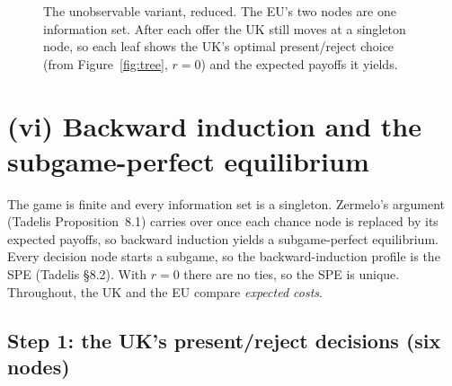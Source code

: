 \documentclass[11pt,a4paper]{article}
\newcommand{\Nt}{\mathit{Nt}}
\newcommand{\dF}{\mathit{F}}
\newcommand{\dU}{\mathit{U}}
\begin{document}
\begin{figure}[p]
\bigskip
{}
\caption{The unobservable variant, reduced. The EU's two nodes are one information set. After
each offer the UK still moves at a singleton node, so each leaf shows the UK's optimal
present/reject choice (from Figure~\ref{fig:tree}, $r=0$) and the expected payoffs it
yields.}\label{fig:unobs}
\end{figure}

\section{(vi) Backward induction and the subgame-perfect equilibrium}

The game is finite and every information set is a singleton. Zermelo's argument (Tadelis
Proposition~8.1) carries over once each chance node is replaced by its expected payoffs, so
backward induction yields a subgame-perfect equilibrium. Every decision node starts a subgame,
so the backward-induction profile is the SPE (Tadelis \S8.2). With $r=0$ there are no ties, so the
SPE is unique. Throughout, the UK and the EU compare \emph{expected costs}.

\subsection{Step 1: the UK's present/reject decisions (six nodes)}
\end{document}
